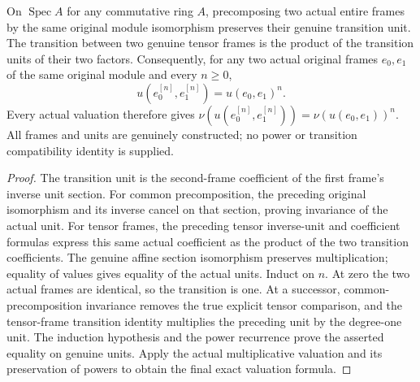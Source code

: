 \begin{theorem}\label{thm:fc-actual-power-frame-transition-units}
\leanok
{}
On $\operatorname{Spec}A$ for any commutative ring $A$, precomposing
two actual entire frames by the same original module isomorphism
preserves their genuine transition unit. The transition between
two genuine tensor frames is the product of the transition units
of their two factors. Consequently, for any two actual original
frames $e_0,e_1$ of the same original module and every $n\geq0$,
\[
 u(e_0^{[n]},e_1^{[n]})=u(e_0,e_1)^n.
\]
Every actual valuation therefore gives
$\nu(u(e_0^{[n]},e_1^{[n]}))=\nu(u(e_0,e_1))^n$.
All frames and units are genuinely constructed; no power or
transition compatibility identity is supplied.
\end{theorem}
\begin{proof}
The transition unit is the second-frame coefficient of the first
frame's inverse unit section. For common precomposition, the
preceding original isomorphism and its inverse cancel on that
section, proving invariance of the actual unit. For tensor frames,
the preceding tensor inverse-unit and coefficient formulas express
this same actual coefficient as the product of the two transition
coefficients. The genuine affine section isomorphism preserves
multiplication; equality of values gives equality of the actual
units. Induct on $n$. At zero the two actual frames are identical,
so the transition is one. At a successor, common-precomposition
invariance removes the true explicit tensor comparison, and the
tensor-frame transition identity multiplies the preceding unit by
the degree-one unit. The induction hypothesis and the power
recurrence prove the asserted equality on genuine units. Apply
the actual multiplicative valuation and its preservation of powers
to obtain the final exact valuation formula.
\end{proof}
